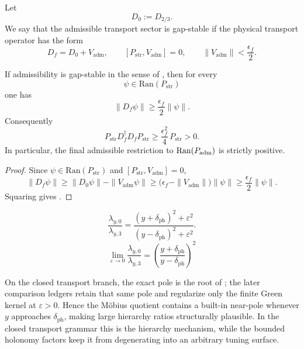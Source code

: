 \begin{definition}
\label{def:gap-stable-admissibility}
Let
\[
D_0:=D_{2/3}.
\]
We say that the admissible transport sector is gap-stable if the physical transport operator has the form
\[
D_f=D_0+V_{\mathrm{adm}},
\qquad
[P_{\mathrm{str}},V_{\mathrm{adm}}]=0,
\qquad
\|V_{\mathrm{adm}}\|<\frac{\epsilon_f}{2}.
\]
\end{definition}

\begin{proposition}
\label{prop:gap-lift-full-operator}
If admissibility is gap-stable in the sense of , then for every
\[
\psi\in\mathrm{Ran}(P_{\mathrm{str}})
\]
one has
\[
\|D_f\psi\|
\ge
\frac{\epsilon_f}{2}\|\psi\|.
\]
Consequently
\begin{equation}
\label{eq:gap-lift-full-operator}
P_{\mathrm{str}} D_f^\dagger D_f P_{\mathrm{str}}
\ge
\frac{\epsilon_f^2}{4}\,P_{\mathrm{str}}
>
0.
\end{equation}
In particular, the final admissible restriction to $\mathrm{Ran}(P_{\mathrm{adm}})$ is strictly positive.
\end{proposition}

\begin{proof}
Since $\psi\in\mathrm{Ran}(P_{\mathrm{str}})$ and $[P_{\mathrm{str}},V_{\mathrm{adm}}]=0$,
\[
\|D_f\psi\|
\ge
\|D_0\psi\|-\|V_{\mathrm{adm}}\psi\|
\ge
\bigl(\epsilon_f-\|V_{\mathrm{adm}}\|\bigr)\|\psi\|
\ge
\frac{\epsilon_f}{2}\|\psi\|.
\]
Squaring gives .
\end{proof}

\begin{equation}
\label{eq:mobius-quotient}
\frac{\lambda_{y,0}}{\lambda_{y,3}}
=
\frac{(y+\delta_{\mathrm{ph}})^2+\varepsilon^2}{(y-\delta_{\mathrm{ph}})^2+\varepsilon^2}.
\end{equation}
\[
\lim_{\varepsilon\to 0}\frac{\lambda_{y,0}}{\lambda_{y,3}}
=
\left(\frac{y+\delta_{\mathrm{ph}}}{y-\delta_{\mathrm{ph}}}\right)^2
\]
\begin{remark}
On the closed transport branch, the exact pole is the root of
; the later comparison ledgers retain that same pole and
regularize only the finite Green kernel at $\varepsilon>0$.
Hence the Möbius quotient contains a built-in near-pole whenever $y$ approaches $\delta_{\mathrm{ph}}$, making large hierarchy ratios structurally plausible. In the closed transport grammar this is the hierarchy mechanism, while the bounded holonomy factors keep it from degenerating into an arbitrary tuning surface.
\end{remark}
